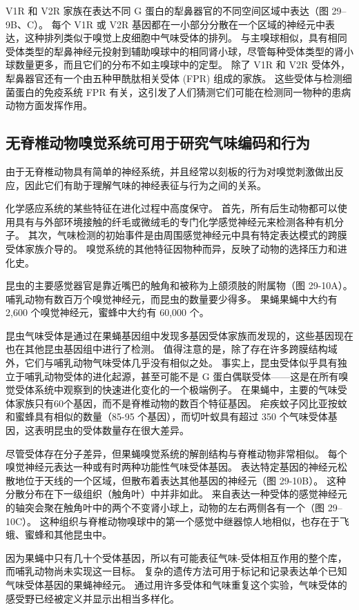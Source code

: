 V1R 和 V2R 家族在表达不同 G 蛋白的犁鼻器官的不同空间区域中表达（图 29–9B、C）。 每个 V1R 或 V2R 基因都在一小部分分散在一个区域的神经元中表达，这种排列类似于嗅觉上皮细胞中气味受体的排列。 与主嗅球相似，具有相同受体类型的犁鼻神经元投射到辅助嗅球中的相同肾小球，尽管每种受体类型的肾小球数量更多，而且它们的分布不如主嗅球中的定型。 除了 V1R 和 V2R 受体外，犁鼻器官还有一个由五种甲酰肽相关受体 (FPR) 组成的家族。 这些受体与检测细菌蛋白的免疫系统 FPR 有关，这引发了人们猜测它们可能在检测同一物种的患病动物方面发挥作用。


\subsection{无脊椎动物嗅觉系统可用于研究气味编码和行为}
由于无脊椎动物具有简单的神经系统，并且经常以刻板的行为对嗅觉刺激做出反应，因此它们有助于理解气味的神经表征与行为之间的关系。

化学感应系统的某些特征在进化过程中高度保守。 首先，所有后生动物都可以使用具有与外部环境接触的纤毛或微绒毛的专门化学感觉神经元来检测各种有机分子。 其次，气味检测的初始事件是由周围感觉神经元中具有特定表达模式的跨膜受体家族介导的。 嗅觉系统的其他特征因物种而异，反映了动物的选择压力和进化史。

昆虫的主要感觉器官是靠近嘴巴的触角和被称为上颌须肢的附属物（图 29-10A）。 哺乳动物有数百万个嗅觉神经元，而昆虫的数量要少得多。 果蝇果蝇中大约有 2,600 个嗅觉神经元，蜜蜂中大约有 60,000 个。

昆虫气味受体是通过在果蝇基因组中发现多基因受体家族而发现的，这些基因现在也在其他昆虫基因组中进行了检测。 值得注意的是，除了存在许多跨膜结构域外，它们与哺乳动物气味受体几乎没有相似之处。 事实上，昆虫受体似乎具有独立于哺乳动物受体的进化起源，甚至可能不是 G 蛋白偶联受体——这是在所有嗅觉受体系统中观察到的快速进化变化的一个极端例子。 在果蝇中，主要的气味受体家族只有60个基因，而不是脊椎动物的数百个特征基因。 疟疾蚊子冈比亚按蚊和蜜蜂具有相似的数量（85-95 个基因），而切叶蚁具有超过 350 个气味受体基因，这表明昆虫的受体数量存在很大差异。

尽管受体存在分子差异，但果蝇嗅觉系统的解剖结构与脊椎动物非常相似。 每个嗅觉神经元表达一种或有时两种功能性气味受体基因。 表达特定基因的神经元松散地位于天线的一个区域，但散布着表达其他基因的神经元（图 29-10B）。 这种分散分布在下一级组织（触角叶）中并非如此。 来自表达一种受体的感觉神经元的轴突会聚在触角叶中的两个不变肾小球上，动物的左右两侧各有一个（图 29–10C）。 这种组织与脊椎动物嗅球中的第一个感觉中继器惊人地相似，也存在于飞蛾、蜜蜂和其他昆虫中。

因为果蝇中只有几十个受体基因，所以有可能表征气味-受体相互作用的整个库，而哺乳动物尚未实现这一目标。 复杂的遗传方法可用于标记和记录表达单个已知气味受体基因的果蝇神经元。 通过用许多受体和气味重复这个实验，气味受体的感受野已经被定义并显示出相当多样化。

